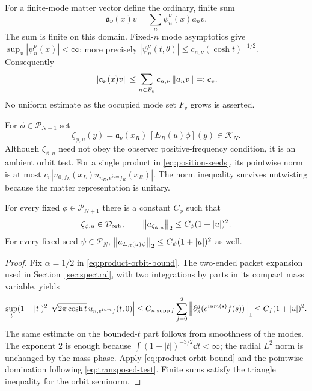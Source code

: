For a finite-mode matter vector define the ordinary, finite sum
\begin{equation}
 \mathfrak a_\nu(x)v=\sum_n\psi^\nu_n(x)a_n v.
 \label{eq:finite-annihilation}
\end{equation}
The sum is finite on this domain. Fixed-$n$ mode asymptotics give
$\sup_x|\psi_n^\nu(x)|<\infty$; more precisely
$|\psi_n^\nu(t,\theta)|\le c_{n,\nu}(\cosh t)^{-1/2}$.
Consequently
\begin{equation}
 \left\lVert\mathfrak a_\nu(x)v\right\rVert\le
 \sum_{n\in F_v}c_{n,\nu}\left\lVert a_nv\right\rVert=:c_v.
 \label{eq:finite-annihilation-bound}
\end{equation}
No uniform estimate as the occupied mode set $F_v$ grows is asserted.

For $\phi\in\mathcal P_{N+1}$ set
\begin{equation}
 \zeta_{\phi,u}(y)=
 \mathfrak a_\nu(x_R)\,[E_R(u)\phi](y)\in\mathcal K_N.
 \label{eq:transposed-test}
\end{equation}
Although $\zeta_{\phi,u}$ need not obey the observer positive-frequency
condition, it is an ambient orbit test. For a single product in
\eqref{eq:position-seeds}, its pointwise norm is at most
$c_v|u_{0,f_L}(x_L)u_{n_R,e^{ium}f_R}(x_R)|$.
The norm inequality survives untwisting because the matter representation
is unitary.

\begin{lemma}
For every fixed $\phi\in\mathcal P_{N+1}$ there is a constant $C_\phi$
such that
\begin{equation}
 \zeta_{\phi,u}\in\mathcal D_{\mathrm{orb}},\qquad
 \left\lVert a_{\zeta_{\phi,u}}\right\rVert_2\le C_\phi(1+|u|)^2.
 \label{eq:transposed-orbit-bound}
\end{equation}
For every fixed seed $\psi\in\mathcal P_N$,
$\left\lVert a_{E_R(u)\psi}\right\rVert_2\le C_\psi(1+|u|)^2$ as well.
\end{lemma}
\begin{proof}
Fix $\alpha=1/2$ in \eqref{eq:product-orbit-bound}. The two-ended packet
expansion used in Section~\ref{sec:spectral}, with two integrations by
parts in its compact mass variable, yields
\[
 \sup_t(1+|t|)^2
 \left|\sqrt{2\pi\cosh t}\,u_{n,e^{ium}f}(t,0)\right|
 \le C_{n,\operatorname{supp} f}\sum_{j=0}^2\left\lVert\partial_s^j(e^{ium(s)}f(s))\right\rVert_1
 \le C_f(1+|u|)^2.
\]
The same estimate on the bounded-$t$ part follows from smoothness of
the modes. The exponent $2$ is enough because
$\int(1+|t|)^{-3/2}\dd t<\infty$; the radial $L^2$ norm is unchanged
by the mass phase. Apply \eqref{eq:product-orbit-bound} and the
pointwise domination following \eqref{eq:transposed-test}.
Finite sums satisfy the triangle inequality for the orbit seminorm.
\end{proof}

